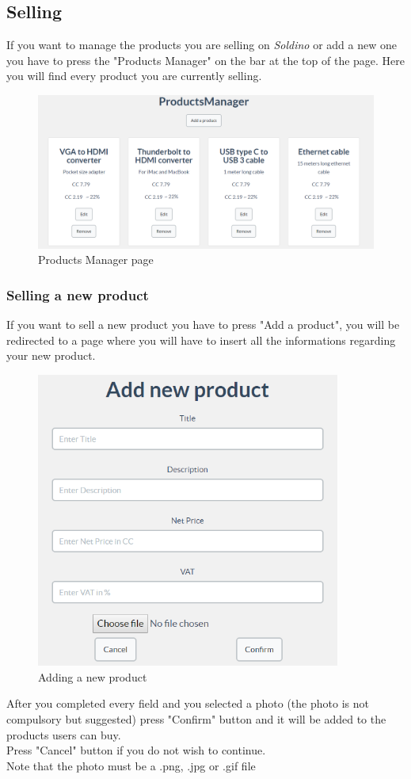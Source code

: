 	\subsection{Selling}
	If you want to manage the products you are selling on \textit{Soldino} 
	or add a new one you have to press the "Products Manager" on the bar at the 
	top of the page. Here you will find every product you are currently selling.
	\begin{figure}[H]
		\includegraphics[width=15cm]{res/images/products_manager.png}
		\centering
		\caption{Products Manager page}
	\end{figure}
		\subsubsection{Selling a new product}
		If you want to sell a new product you have to press "Add a product", you 
		will be redirected to a page where you will have to insert all the 
		informations regarding your new product.
		\begin{figure}[H]
			\includegraphics[width=10cm]{res/images/add_new_product.png}
			\centering
			\caption{Adding a new product}
		\end{figure}
		\noindent After you completed every field and you selected a photo 
		(the photo is not compulsory but suggested) press "Confirm" button and 
		it will be added to the products users can buy.
		\\Press "Cancel" button if you do not wish to continue.
		\\Note that the photo must be a .png, .jpg or .gif file

